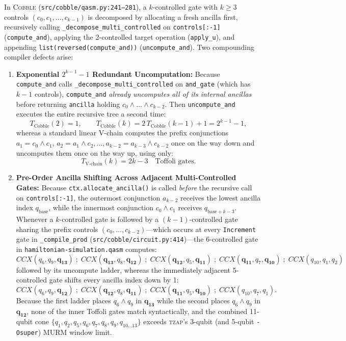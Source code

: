 \documentclass[11pt,a4paper]{article}
\theoremstyle{definition}
\begin{document}
In \textsc{Cobble} (\texttt{src/cobble/qasm.py:241--281}), a $k$-controlled gate with $k \ge 3$ controls $(c_0, c_1, \dots, c_{k-1})$ is decomposed by allocating a fresh ancilla first, recursively calling \texttt{\_decompose\_multi\_controlled} on \texttt{controls[:-1]} (\texttt{compute\_and}), applying the 2-controlled target operation (\texttt{apply\_u}), and appending \texttt{list(reversed(compute\_and))} (\texttt{uncompute\_and}). Two compounding compiler defects arise:
\begin{enumerate}
  \item \textbf{Exponential $2^{k-1}-1$ Redundant Uncomputation:} Because \texttt{compute\_and} calls \texttt{\_decompose\_multi\_controlled} on \texttt{and\_gate} (which has $k-1$ controls), \texttt{compute\_and} \emph{already uncomputes all of its internal ancillas} before returning \texttt{ancilla} holding $c_0 \land \dots \land c_{k-2}$. Then \texttt{uncompute\_and} executes the entire recursive tree a second time:
  \[
    T_{\mathrm{Cobble}}(2) = 1, \qquad T_{\mathrm{Cobble}}(k) = 2\,T_{\mathrm{Cobble}}(k-1) + 1 = 2^{k-1} - 1,
  \]
  whereas a standard linear V-chain computes the prefix conjunctions $a_1 = c_0 \land c_1$, $a_2 = a_1 \land c_2, \dots, a_{k-2} = a_{k-3} \land c_{k-2}$ once on the way down and uncomputes them once on the way up, using only:
  \[
    T_{\mathrm{V\text{-}chain}}(k) = 2k - 3 \quad \text{Toffoli gates.}
  \]
  \item \textbf{Pre-Order Ancilla Shifting Across Adjacent Multi-Controlled Gates:} Because \texttt{ctx.allocate\_ancilla()} is called \emph{before} the recursive call on \texttt{controls[:-1]}, the outermost conjunction $a_{k-2}$ receives the lowest ancilla index $q_{\mathrm{base}}$, while the innermost conjunction $c_0 \land c_1$ receives $q_{\mathrm{base} + k - 3}$. Whenever a $k$-controlled gate is followed by a $(k-1)$-controlled gate sharing the prefix controls $(c_0, \dots, c_{k-2})$---which occurs at every \texttt{Increment} gate in \texttt{\_compile\_prod} (\texttt{src/cobble/circuit.py:414})---the 6-controlled gate in \texttt{hamiltonian-simulation.qasm} computes:
  \[
    \mathit{CCX}(q_6, q_9, \mathbf{q_{13}}) \;;\; \mathit{CCX}(\mathbf{q_{13}}, q_8, \mathbf{q_{12}}) \;;\; \mathit{CCX}(\mathbf{q_{12}}, q_5, \mathbf{q_{11}}) \;;\; \mathit{CCX}(\mathbf{q_{11}}, q_7, \mathbf{q_{10}}) \;;\; \mathit{CCX}(q_{10}, q_1, q_2)
  \]
  followed by its uncompute ladder, whereas the immediately adjacent 5-controlled gate shifts every ancilla index down by 1:
  \[
    \mathit{CCX}(q_6, q_9, \mathbf{q_{12}}) \;;\; \mathit{CCX}(\mathbf{q_{12}}, q_8, \mathbf{q_{11}}) \;;\; \mathit{CCX}(\mathbf{q_{11}}, q_5, \mathbf{q_{10}}) \;;\; \mathit{CCX}(q_{10}, q_7, q_1).
  \]
  Because the first ladder places $q_6 \land q_9$ in $\mathbf{q_{13}}$ while the second places $q_6 \land q_9$ in $\mathbf{q_{12}}$, none of the inner Toffoli gates match syntactically, and the combined 11-qubit cone $\{q_1, q_2, q_5, q_6, q_7, q_8, q_9, q_{10\dots 13}\}$ exceeds \textsc{tzap}'s 3-qubit (and 5-qubit \texttt{-Osuper}) MURM window limit.
\end{enumerate}
\end{document}
